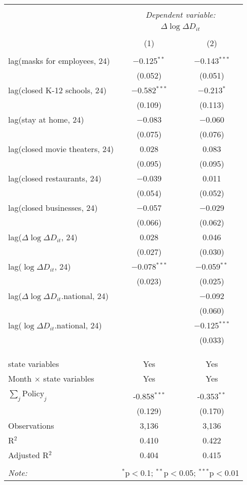 \begin{tabular}{@{\extracolsep{1pt}}lcc} 
\\[-1.8ex]\hline 
\hline \\[-1.8ex] 
 & \multicolumn{2}{c}{\textit{Dependent variable:}} \\ 
\cline{2-3} 
 & \multicolumn{2}{c}{$\Delta \log \Delta D_{it}$} \\ 
\\[-1.8ex] & (1) & (2)\\ 
\hline \\[-1.8ex] 
 lag(masks for employees, 24) & $-$0.125$^{**}$ & $-$0.143$^{***}$ \\ 
  & (0.052) & (0.051) \\ 
  lag(closed K-12 schools, 24) & $-$0.582$^{***}$ & $-$0.213$^{*}$ \\ 
  & (0.109) & (0.113) \\ 
  lag(stay at home, 24) & $-$0.083 & $-$0.060 \\ 
  & (0.075) & (0.076) \\ 
  lag(closed movie theaters, 24) & 0.028 & 0.083 \\ 
  & (0.095) & (0.095) \\ 
  lag(closed restaurants, 24) & $-$0.039 & 0.011 \\ 
  & (0.054) & (0.052) \\ 
  lag(closed businesses, 24) & $-$0.057 & $-$0.029 \\ 
  & (0.066) & (0.062) \\ 
  lag($\Delta \log \Delta D_{it}$, 24) & 0.028 & 0.046 \\ 
  & (0.027) & (0.030) \\ 
  lag($\log \Delta D_{it}$, 24) & $-$0.078$^{***}$ & $-$0.059$^{**}$ \\ 
  & (0.023) & (0.025) \\ 
  lag($\Delta \log \Delta D_{it}$.national, 24) &  & $-$0.092 \\ 
  &  & (0.060) \\ 
  lag($\log \Delta D_{it}$.national, 24) &  & $-$0.125$^{***}$ \\ 
  &  & (0.033) \\ 
   &  &  \\ 
  &  &  \\ 
 \hline \\[-1.8ex] 
state variables & Yes & Yes \\ 
Month $\times$ state variables & Yes & Yes \\ 
\hline \\[-1.8ex] 
$\sum_j \mathrm{Policy}_j$ & -0.858$^{***}$ & -0.353$^{**}$ \\ 
 & (0.129) & (0.170) \\ 
Observations & 3,136 & 3,136 \\ 
R$^{2}$ & 0.410 & 0.422 \\ 
Adjusted R$^{2}$ & 0.404 & 0.415 \\ 
\hline 
\hline \\[-1.8ex] 
\textit{Note:}  & \multicolumn{2}{r}{$^{*}$p$<$0.1; $^{**}$p$<$0.05; $^{***}$p$<$0.01} \\ 
\end{tabular} 